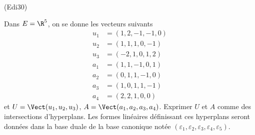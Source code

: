 \begin{tiny}(Edi30)\end{tiny} Dans $E = \R^5$, on se donne les vecteurs suivants
\[
 \begin{aligned}
  u_1 &= (1,2,-1,-1,0)\\
  u_2 &= (1,1,1,0,-1)\\
  u_3 &= (-2,1,0,1,2)\\
  a_1 &= (1,1,-1,0,1)\\
  a_2 &= (0,1,1,-1,0)\\
  a_3 &= (1,0,1,1,-1)\\
  a_4 &= (2,2,1,0,0)
 \end{aligned}
\]
et $U= \Vect(u_1,u_2,u_3)$, $A= \Vect(a_1,a_2,a_3,a_4)$.\newline
Exprimer $U$ et $A$ comme des intersections d'hyperplans. Les formes linéaires définissant ces hyperplans seront données dans la base duale de la base canonique notée $(\varepsilon_1,\varepsilon_2,\varepsilon_3,\varepsilon_4,\varepsilon_5)$.